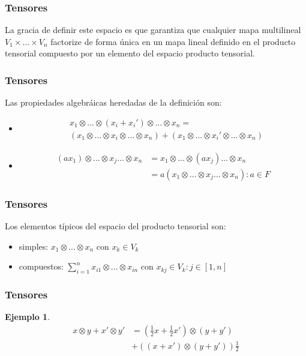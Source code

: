 \documentclass{beamer}
\newtheorem{ejemplo}{Ejemplo}
\begin{document}
\begin{frame}
    \frametitle{Tensores}
    La gracia de definir este espacio es que garantiza que cualquier mapa multilineal
    $V_1 \times ... \times V_n$ factorize de forma única en un mapa lineal definido
    en el producto tensorial compuesto por un elemento del espacio producto tensorial.
\end{frame}
\begin{frame}
    \frametitle{Tensores}
    Las propiedades algebráicas heredadas de la definición son:
    \begin{itemize}
        \item $$
            \begin{aligned}
                &x_1 \otimes ... \otimes (x_i + x_i') \otimes ... \otimes x_n =\\
                &(x_1 \otimes ... \otimes x_i \otimes ... \otimes x_n) + (x_1 \otimes ... \otimes x_i' \otimes ... \otimes x_n)
            \end{aligned}
            $$
        \item $$
            \begin{aligned}
                (a x_1) \otimes ... \otimes x_j ...\otimes x_n &=x_1 \otimes ... \otimes (a x_j) ...\otimes x_n \\
                &=a(x_1 \otimes ... \otimes x_j ...\otimes x_n) : a \in F
            \end{aligned}
            $$
    \end{itemize}
\end{frame}
\begin{frame}
    \frametitle{Tensores}
    Los elementos típicos del espacio del producto tensorial son:
    \begin{itemize}
        \item simples: $x_1\otimes ... \otimes x_n$ con $x_k \in V_k$
        \item compuestos: $\sum_{i=1}^n x_{i1}\otimes ... \otimes x_{in}$ con $x_{kj} \in V_k : j \in [1,n]$
    \end{itemize}
\end{frame}
\begin{frame}
    \frametitle{Tensores}
    \begin{ejemplo}
        $$
        \begin{aligned}
            x \otimes y + x' \otimes y' &= ( \frac{1}{2} x + \frac{1}{2} x') \otimes (y + y')\\
            &+ ((x+x')\otimes (y+y')) \frac{1}{2}
        \end{aligned}
        $$
    \end{ejemplo}
\end{frame}
\end{document}

